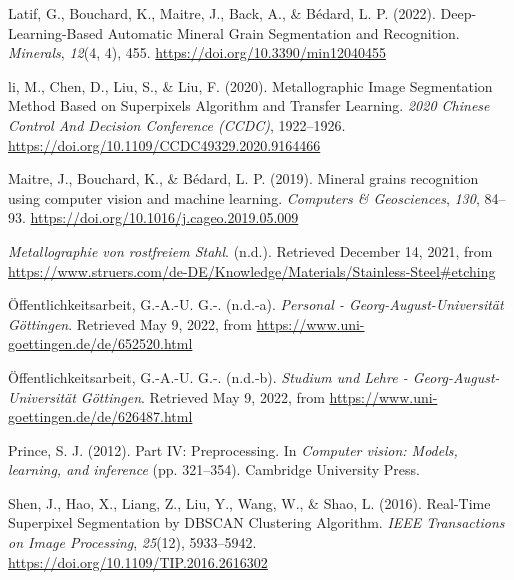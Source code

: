 \documentclass[
  12pt,
]{book}
\newlength{\cslhangindent}
\newlength{\cslentryspacingunit} %
\newenvironment{CSLReferences}[2] %
 {%
  \setlength{\parindent}{0pt}
  \ifodd #1
  \let\oldpar\par
  \def\par{\hangindent=\cslhangindent\oldpar}
  \fi
  \setlength{\parskip}{#2\cslentryspacingunit}
 }%
 {}
\begin{document}
\begin{CSLReferences}{1}{0}
\leavevmode{}%
Latif, G., Bouchard, K., Maitre, J., Back, A., \& Bédard, L. P. (2022). Deep-{Learning-Based Automatic Mineral Grain Segmentation} and {Recognition}. \emph{Minerals}, \emph{12}(4, 4), 455. \url{https://doi.org/10.3390/min12040455}

\leavevmode{}%
li, M., Chen, D., Liu, S., \& Liu, F. (2020). Metallographic {Image Segmentation Method Based} on {Superpixels Algorithm} and {Transfer Learning}. \emph{2020 {Chinese Control And Decision Conference} ({CCDC})}, 1922--1926. \url{https://doi.org/10.1109/CCDC49329.2020.9164466}

\leavevmode{}%
Maitre, J., Bouchard, K., \& Bédard, L. P. (2019). Mineral grains recognition using computer vision and machine learning. \emph{Computers \& Geosciences}, \emph{130}, 84--93. \url{https://doi.org/10.1016/j.cageo.2019.05.009}

\leavevmode{}%
\emph{Metallographie von rostfreiem {Stahl}}. (n.d.). Retrieved December 14, 2021, from \url{https://www.struers.com/de-DE/Knowledge/Materials/Stainless-Steel\#etching}

\leavevmode{}%
Öffentlichkeitsarbeit, G.-A.-U. G.-. (n.d.-a). \emph{Personal - Georg-August-Universität Göttingen}. Retrieved May 9, 2022, from \url{https://www.uni-goettingen.de/de/652520.html}

\leavevmode{}%
Öffentlichkeitsarbeit, G.-A.-U. G.-. (n.d.-b). \emph{Studium und Lehre - Georg-August-Universität Göttingen}. Retrieved May 9, 2022, from \url{https://www.uni-goettingen.de/de/626487.html}

\leavevmode{}%
Prince, S. J. (2012). Part {IV}: {Preprocessing}. In \emph{Computer vision: Models, learning, and inference} (pp. 321--354). {Cambridge University Press}.

\leavevmode{}%
Shen, J., Hao, X., Liang, Z., Liu, Y., Wang, W., \& Shao, L. (2016). Real-{Time Superpixel Segmentation} by {DBSCAN Clustering Algorithm}. \emph{IEEE Transactions on Image Processing}, \emph{25}(12), 5933--5942. \url{https://doi.org/10.1109/TIP.2016.2616302}


\end{CSLReferences}
\end{document}
